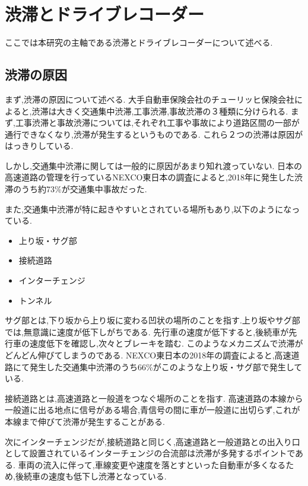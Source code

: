 \chapter{渋滞とドライブレコーダー}

ここでは本研究の主軸である渋滞とドライブレコーダーについて述べる.
\section{渋滞の原因}
まず,渋滞の原因について述べる.
大手自動車保険会社のチューリッヒ保険会社によると,渋滞は大きく交通集中渋滞,工事渋滞,事故渋滞の３種類に分けられる\cite{zurich}.
まず,工事渋滞と事故渋滞については,それぞれ工事や事故により道路区間の一部が通行できなくなり,渋滞が発生するというものである.
これら２つの渋滞は原因がはっきりしている.

しかし,交通集中渋滞に関しては一般的に原因があまり知れ渡っていない.
日本の高速道路の管理を行っているNEXCO東日本の調査によると,2018年に発生した渋滞のうち約73\%が交通集中事故だった\cite{NEXCOeast}.

また,交通集中渋滞が特に起きやすいとされている場所もあり,以下のようになっている.

\begin{itemize}
  \item 上り坂・サグ部
  \item 接続道路
  \item インターチェンジ
  \item トンネル
\end{itemize}

サグ部とは,下り坂から上り坂に変わる凹状の場所のことを指す.上り坂やサグ部では,無意識に速度が低下しがちである.
先行車の速度が低下すると,後続車が先行車の速度低下を確認し,次々とブレーキを踏む.
このようなメカニズムで渋滞がどんどん伸びてしまうのである.
NEXCO東日本の2018年の調査によると,高速道路にて発生した交通集中渋滞のうち66\%がこのような上り坂・サグ部で発生している\cite{NEXCOeast}.

接続道路とは,高速道路と一般道をつなぐ場所のことを指す.
高速道路の本線から一般道に出る地点に信号がある場合,青信号の間に車が一般道に出切らず,これが本線まで伸びて渋滞が発生することがある\cite{zurich}.

次にインターチェンジだが,接続道路と同じく,高速道路と一般道路との出入り口として設置されているインターチェンジの合流部は渋滞が多発するポイントである\cite{zurich}.
車両の流入に伴って,車線変更や速度を落とすといった自動車が多くなるため,後続車の速度も低下し渋滞となっている.

